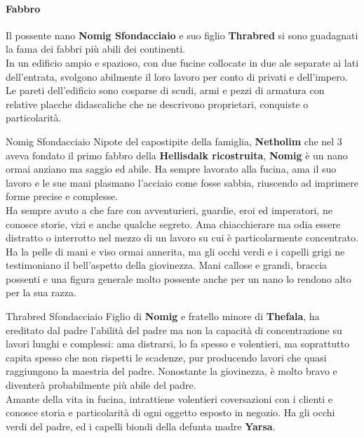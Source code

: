\documentclass[10pt,twoside,onecolumn,openany]{book}
\begin{document}
\paragraph{Fabbro}
Il possente nano \textbf{Nomig Sfondacciaio} e suo figlio \textbf{Thrabred} si sono guadagnati la fama dei fabbri più abili dei continenti.\\
In un edificio ampio e spazioso, con due fucine collocate in due ale separate ai lati dell'entrata, svolgono abilmente il loro lavoro per conto di privati e dell'impero. Le pareti dell'edificio sono cosparse di scudi, armi e pezzi di armatura con relative placche didascaliche che ne descrivono proprietari, conquiste o particolarità.\\
\begin{multicols}{2}
\begin{paperbox}{{Nomig Sfondacciaio}}
Nipote del capostipite della famiglia, \textbf{Netholim} che nel 3 aveva fondato il primo fabbro della \textbf{Hellisdalk ricostruita}, \textbf{Nomig} è un nano ormai anziano ma saggio ed abile. Ha sempre lavorato alla fucina, ama il suo lavoro e le sue mani plasmano l'acciaio come fosse sabbia, riuscendo ad imprimere forme precise e complesse.\\
Ha sempre avuto a che fare con avventurieri, guardie, eroi ed imperatori, ne conosce storie, vizi e anche qualche segreto. Ama chiacchierare ma odia essere distratto o interrotto nel mezzo di un lavoro su cui è particolarmente concentrato.\\
Ha la pelle di mani e viso ormai annerita, ma gli occhi verdi e i capelli grigi ne testimoniano il bell'aspetto della giovinezza. Mani callose e grandi, braccia possenti e una figura generale molto possente anche per un nano lo rendono alto per la sua razza.
\end{paperbox}
\columnbreak
\begin{paperbox}{{Thrabred Sfondacciaio}}
Figlio di \textbf{Nomig} e fratello minore di \textbf{Thefala}, ha ereditato dal padre l'abilità del padre ma non la capacità di concentrazione su lavori lunghi e complessi: ama distrarsi, lo fa spesso e volentieri, ma soprattutto capita spesso che non rispetti le scadenze, pur producendo lavori che quasi raggiungono la maestria del padre. Nonostante la giovinezza, è molto bravo e diventerà probabilmente più abile del padre.\\
Amante della vita in fucina, intrattiene volentieri coversazioni con i clienti e conosce storia e particolarità di ogni oggetto esposto in negozio. Ha gli occhi verdi del padre, ed i capelli biondi della defunta madre \textbf{Yarsa}.
\end{paperbox}
\end{multicols}
\end{document}
